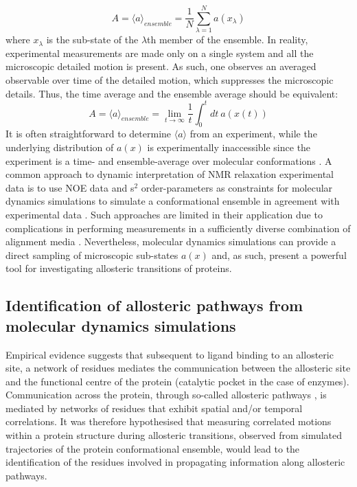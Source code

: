 %
%
\begin{equation}
A = \langle a \rangle_{ensemble} = \frac{1}{N} \sum^{N}_{\lambda = 1} a(x_{\lambda})
\end{equation}
%
%
where $x_{\lambda}$ is the sub-state of the $\lambda$th member of the ensemble. In reality, experimental measurements are made only on a single system and all the microscopic detailed motion is present. As such, one observes an averaged observable over time of the detailed motion, which suppresses the microscopic details. Thus, the time average and the ensemble average should be equivalent:
%
%
\begin{equation}
A = \langle a \rangle_{ensemble} = \displaystyle\lim_{t \to \infty} \frac{1}{t} \int_{0}^{t} dt \: a(x(t))
\end{equation}
%
%
It is often straightforward to determine $\langle a \rangle$ from an experiment, while the underlying distribution of $a(x)$ is experimentally inaccessible since the experiment is a time- and ensemble-average over molecular conformations \cite{Burgi:2001aa}. A common approach to dynamic interpretation of NMR relaxation experimental data is to use NOE data and s$^{2}$ order-parameters as constraints for molecular dynamics simulations to simulate a conformational ensemble in agreement with experimental data \cite{Lindorff-Larsen:2005aa}. Such approaches are limited in their application due to complications in performing measurements in a sufficiently diverse combination of alignment media \cite{Guerry:2013aa}. Nevertheless, molecular dynamics simulations can provide a direct sampling of microscopic sub-states $a(x)$ and, as such, present a powerful tool for investigating allosteric transitions of proteins. 


\subsection{Identification of allosteric pathways from molecular dynamics simulations}
Empirical evidence suggests that subsequent to ligand binding to an allosteric site, a network of residues mediates the communication between the allosteric site and the functional centre of the protein (catalytic pocket in the case of enzymes). Communication across the protein, through so-called allosteric pathways \cite{Sol:2009aa}, is mediated by networks of residues that exhibit spatial and/or temporal correlations. It was therefore hypothesised that measuring correlated motions within a protein structure during allosteric transitions, observed from simulated trajectories of the protein conformational ensemble, would lead to the identification of the residues involved in propagating information along allosteric pathways. 

